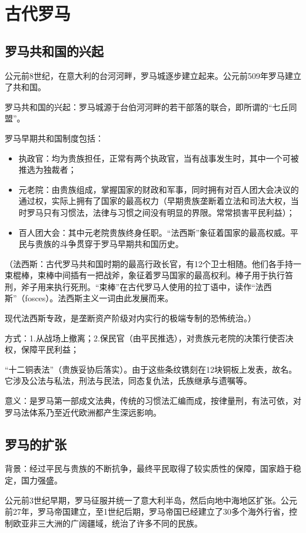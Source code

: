 \section{古代罗马}
\subsection{罗马共和国的兴起}
公元前8世纪，在意大利的台河河畔，罗马城逐步建立起来。公元前509年罗马建立了共和国。

罗马共和国的兴起：罗马城源于台伯河河畔的若干部落的联合，即所谓的“七丘同盟”。

罗马早期共和国制度包括：
\begin{itemize}
    \item 执政官：均为贵族担任，正常有两个执政官，当有战事发生时，其中一个可被推选为独裁者；
    \item 元老院：由贵族组成，掌握国家的财政和军事，同时拥有对百人团大会决议的通过权，实际上拥有了国家的最高权力（早期贵族垄断着立法和司法大权，当时罗马只有习惯法，法律与习惯之间没有明显的界限。常常损害平民利益）；
    \item 百人团大会：其中元老院贵族终身任职。“法西斯”象征着国家的最高权威。平民与贵族的斗争贯穿于罗马早期共和国历史。
\end{itemize}

（法西斯：古代罗马共和国时期的最高行政长官，有12个卫士相随。他们各手持一束棍棒，束棒中间插有一把战斧，象征着罗马国家的最高权利。棒子用于执行笞刑，斧子用来执行死刑。“束棒”在古代罗马人使用的拉丁语中，读作“法西斯”（fosces）。法西斯主义一词由此发展而来。

现代法西斯专政，是垄断资产阶级对内实行的极端专制的恐怖统治。）

方式：1.从战场上撤离；2.保民官（由平民推选），对贵族元老院的决策行使否决权，保障平民利益；

“十二铜表法”（贵族妥协后落实）。由于这些条纹镌刻在12块铜板上发表，故名。它涉及公法与私法，刑法与民法，同态复仇法，氏族继承与遗嘱等。

意义：是罗马第一部成文法典，传统的习惯法汇编而成，按律量刑，有法可依，对罗马法体系乃至近代欧洲都产生深远影响。

\subsection{罗马的扩张}

背景：经过平民与贵族的不断抗争，最终平民取得了较实质性的保障，国家趋于稳定，国力强盛。

公元前3世纪早期，罗马征服并统一了意大利半岛，然后向地中海地区扩张。公元前27年，罗马帝国建立，至1世纪后期，罗马帝国已经建立了30多个海外行省，控制欧亚非三大洲的广阔疆域，统治了许多不同的民族。

